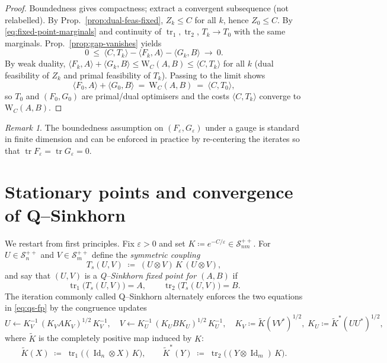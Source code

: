 \documentclass[10pt]{article}
\newcommand{\Ss}{\mathcal{S}}
\newcommand{\Id}{\operatorname{Id}}
\newcommand{\tr}{\operatorname{tr}}
\renewcommand{\epsilon}{\varepsilon}
\newcommand{\eqdef}{\coloneqq}
\newcommand{\Ko}{\widetilde{K}}
\providecommand{\dotp}[2]{\langle #1, #2\rangle}
\theoremstyle{plain}
\theoremstyle{definition}
\theoremstyle{remark}
\newtheorem{rem}{Remark}
\begin{document}
\begin{proof}
Boundedness gives compactness; extract a convergent subsequence (not relabelled). By Prop.~\ref{prop:dual-feas-fixed}, $Z_k\le C$ for all $k$, hence $Z_0\le C$. By \eqref{eq:fixed-point-marginals} and continuity of $\tr_1,\tr_2$, $T_k\to T_0$ with the same marginals. Prop.~\ref{prop:gap-vanishes} yields
\[
0\ \le\ \dotp{C}{T_k}-\dotp{F_k}{A}-\dotp{G_k}{B}\ \longrightarrow\ 0.
\]
By weak duality,
$\dotp{F_k}{A}+\dotp{G_k}{B}\le \mathrm{W}_C(A,B)\le \dotp{C}{T_k}$ for all $k$ (dual feasibility of $Z_k$ and primal feasibility of $T_k$). Passing to the limit shows
\[
\dotp{F_0}{A}+\dotp{G_0}{B}\ =\ \mathrm{W}_C(A,B)\ =\ \dotp{C}{T_0},
\]
so $T_0$ and $(F_0,G_0)$ are primal/dual optimisers and the costs $\dotp{C}{T_k}$ converge to $\mathrm{W}_C(A,B)$.
\end{proof}

\begin{rem}
The boundedness assumption on $(F_\epsilon,G_\epsilon)$ under a gauge is standard in finite dimension and can be enforced in practice by re-centering the iterates so that $\tr F_\epsilon=\tr G_\epsilon=0$.
\end{rem}



\section{Stationary points and convergence of Q--Sinkhorn}
\label{sec:qsinkhorn-stationary-convergence}

We restart from first principles. Fix $\epsilon>0$ and set $K\eqdef e^{-C/\epsilon}\in \Ss_{nm}^{++}$.
For $U\in \Ss_n^{++}$ and $V\in \Ss_m^{++}$ define the \emph{symmetric coupling}
\[
T_s(U,V)\;\eqdef\;(U\otimes V)\,K\,(U\otimes V),
\]
and say that $(U,V)$ is a \emph{Q--Sinkhorn fixed point for $(A,B)$} if
\begin{equation}\label{eq:qs-fp}
\tr_1\!\big(T_s(U,V)\big)=A,\qquad \tr_2\!\big(T_s(U,V)\big)=B.
\end{equation}
The iteration commonly called Q--Sinkhorn alternately enforces the two equations in \eqref{eq:qs-fp} by the congruence updates
\[
U \leftarrow K_V^{-1}\,(K_V A K_V)^{1/2}\,K_V^{-1}, \quad
V \leftarrow K_U^{-1}\,(K_U B K_U)^{1/2}\,K_U^{-1},\quad
K_V\eqdef \Ko(VV^\ast)^{1/2},\;K_U\eqdef \Ko^\ast(UU^\ast)^{1/2},
\]
where $\Ko$ is the completely positive map induced by $K$:
\[
\Ko(X)\;\eqdef\;\tr_1\!\big((\Id_n\otimes X)\,K\big),\qquad
\Ko^\ast(Y)\;\eqdef\;\tr_2\!\big((Y\otimes \Id_m)\,K\big).
\]
\end{document}
